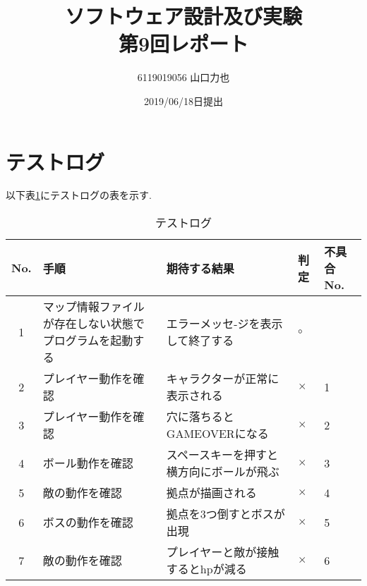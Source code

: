 \documentclass{jarticle}
\title{ソフトウェア設計及び実験\\
	第9回レポート}
\author{6119019056 山口力也}
\date{2019/06/18日提出}
\begin{document}
\maketitle
\section{テストログ}
以下表\ref{table:testlog}にテストログの表を示す.

\begin{table}[H]
  \centering
  \caption{テストログ}
  \begin{tabular}{|c|p{2cm}|p{2cm}|p{2cm}|p{2cm}|} \hline
    No. & 手順 & 期待する結果 & 判定 & 不具合No. \\ \hline
	 1 & マップ情報ファイルが存在しない状態でプログラムを起動する & エラーメッセ-ジを表示して終了する & $\circ$ & \\ \hline
    2 & プレイヤー動作を確認 & キャラクターが正常に表示される & $\times$ &1 \\ \hline
	 3 & プレイヤー動作を確認 & 穴に落ちるとGAMEOVERになる & $\times$ & 2 \\ \hline
	 4 & ボール動作を確認 & スペースキーを押すと横方向にボールが飛ぶ & $\times$ & 3 \\ \hline
	 5 & 敵の動作を確認 & 拠点が描画される & $\times$ & 4 \\ \hline
	 6 & ボスの動作を確認 & 拠点を3つ倒すとボスが出現 & $\times$ & 5 \\ \hline 
	 7 & 敵の動作を確認 & プレイヤーと敵が接触するとhpが減る & $\times$ & 6 \\ \hline
  \end{tabular}
  \label{table:testlog}
\end{table}
\end{document}
